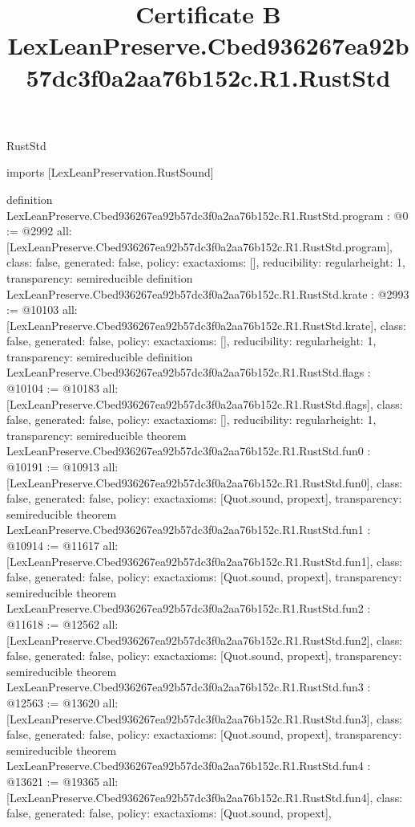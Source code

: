 \begin{lexlean}{RustStd}
\title{Certificate B LexLeanPreserve.Cbed936267ea92b57dc3f0a2aa76b152c.R1.RustStd}
\begin{coremodule}
imports [LexLeanPreservation.RustSound]

definition LexLeanPreserve.Cbed936267ea92b57dc3f0a2aa76b152c.R1.RustStd.program : @0 := @2992 {
  all: [LexLeanPreserve.Cbed936267ea92b57dc3f0a2aa76b152c.R1.RustStd.program],
  class: false,
  generated: false,
  policy: exact{axioms: []},
  reducibility: regular{height: 1},
  transparency: semireducible
}
definition LexLeanPreserve.Cbed936267ea92b57dc3f0a2aa76b152c.R1.RustStd.krate : @2993 := @10103 {
  all: [LexLeanPreserve.Cbed936267ea92b57dc3f0a2aa76b152c.R1.RustStd.krate],
  class: false,
  generated: false,
  policy: exact{axioms: []},
  reducibility: regular{height: 1},
  transparency: semireducible
}
definition LexLeanPreserve.Cbed936267ea92b57dc3f0a2aa76b152c.R1.RustStd.flags : @10104 := @10183 {
  all: [LexLeanPreserve.Cbed936267ea92b57dc3f0a2aa76b152c.R1.RustStd.flags],
  class: false,
  generated: false,
  policy: exact{axioms: []},
  reducibility: regular{height: 1},
  transparency: semireducible
}
theorem LexLeanPreserve.Cbed936267ea92b57dc3f0a2aa76b152c.R1.RustStd.fun0 : @10191 := @10913 {
  all: [LexLeanPreserve.Cbed936267ea92b57dc3f0a2aa76b152c.R1.RustStd.fun0],
  class: false,
  generated: false,
  policy: exact{axioms: [Quot.sound, propext]},
  transparency: semireducible
}
theorem LexLeanPreserve.Cbed936267ea92b57dc3f0a2aa76b152c.R1.RustStd.fun1 : @10914 := @11617 {
  all: [LexLeanPreserve.Cbed936267ea92b57dc3f0a2aa76b152c.R1.RustStd.fun1],
  class: false,
  generated: false,
  policy: exact{axioms: [Quot.sound, propext]},
  transparency: semireducible
}
theorem LexLeanPreserve.Cbed936267ea92b57dc3f0a2aa76b152c.R1.RustStd.fun2 : @11618 := @12562 {
  all: [LexLeanPreserve.Cbed936267ea92b57dc3f0a2aa76b152c.R1.RustStd.fun2],
  class: false,
  generated: false,
  policy: exact{axioms: [Quot.sound, propext]},
  transparency: semireducible
}
theorem LexLeanPreserve.Cbed936267ea92b57dc3f0a2aa76b152c.R1.RustStd.fun3 : @12563 := @13620 {
  all: [LexLeanPreserve.Cbed936267ea92b57dc3f0a2aa76b152c.R1.RustStd.fun3],
  class: false,
  generated: false,
  policy: exact{axioms: [Quot.sound, propext]},
  transparency: semireducible
}
theorem LexLeanPreserve.Cbed936267ea92b57dc3f0a2aa76b152c.R1.RustStd.fun4 : @13621 := @19365 {
  all: [LexLeanPreserve.Cbed936267ea92b57dc3f0a2aa76b152c.R1.RustStd.fun4],
  class: false,
  generated: false,
  policy: exact{axioms: [Quot.sound, propext]},
}
\end{coremodule}
\end{lexlean}
